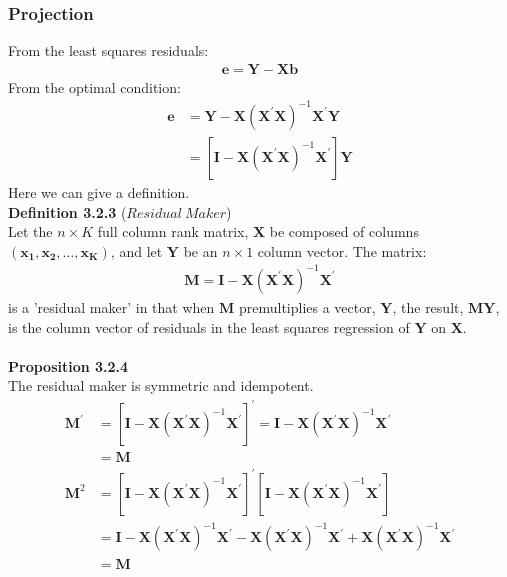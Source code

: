 \documentclass{article}
\begin{document}
\subsubsection{Projection}
From the least squares residuals:
	\begin{align*}
		\boldsymbol{e} = \boldsymbol{Y} - \boldsymbol{X} \boldsymbol{b}
	\end{align*}
From the optimal condition:
	\begin{align*}
		\boldsymbol{e} &= \boldsymbol{Y} - \boldsymbol{X} (\boldsymbol{X}^\prime \boldsymbol{X})^{-1} \boldsymbol{X}^\prime \boldsymbol{Y}\\
		&= [\boldsymbol{I} - \boldsymbol{X} (\boldsymbol{X}^\prime \boldsymbol{X})^{-1} \boldsymbol{X}^\prime] \boldsymbol{Y}
	\end{align*}
Here we can give a definition.\\
\textbf{Definition 3.2.3} ($Residual\ Maker$)\\
Let the $n \times K$ full column rank matrix, $\boldsymbol{X}$ be composed of columns $(\boldsymbol{x_1}, \boldsymbol{x_2}, \ldots, \boldsymbol{x_K})$, and let $\boldsymbol{Y}$ be an $n \times 1$ column vector. The matrix:
	\begin{align*}
		\boldsymbol{M} = \boldsymbol{I} - \boldsymbol{X} (\boldsymbol{X}^\prime \boldsymbol{X})^{-1} \boldsymbol{X}^\prime
	\end{align*}
is a 'residual maker' in that when $\boldsymbol{M}$ premultiplies a vector, $\boldsymbol{Y}$, the result, $\boldsymbol{MY}$, is the column vector of residuals in the least squares regression of $\boldsymbol{Y}$ on $\boldsymbol{X}$.\\\\
\textbf{Proposition 3.2.4}\\
The residual maker is symmetric and idempotent.
	\begin{align*}
		\boldsymbol{M}^\prime &= [\boldsymbol{I} - \boldsymbol{X} (\boldsymbol{X}^\prime \boldsymbol{X})^{-1} \boldsymbol{X}^\prime]^\prime = \boldsymbol{I} - \boldsymbol{X} (\boldsymbol{X}^\prime \boldsymbol{X})^{-1} \boldsymbol{X}^\prime\\
		&= \boldsymbol{M}\\
		\boldsymbol{M}^2 &= [\boldsymbol{I} - \boldsymbol{X} (\boldsymbol{X}^\prime \boldsymbol{X})^{-1} \boldsymbol{X}^\prime]^\prime [\boldsymbol{I} - \boldsymbol{X} (\boldsymbol{X}^\prime \boldsymbol{X})^{-1} \boldsymbol{X}^\prime]\\
		&= \boldsymbol{I} - \boldsymbol{X} (\boldsymbol{X}^\prime \boldsymbol{X})^{-1} \boldsymbol{X}^\prime - \boldsymbol{X} (\boldsymbol{X}^\prime \boldsymbol{X})^{-1} \boldsymbol{X}^\prime + \boldsymbol{X} (\boldsymbol{X}^\prime \boldsymbol{X})^{-1} \boldsymbol{X}^\prime\\
		&= \boldsymbol{M}
	\end{align*}\\\\
\end{document}
